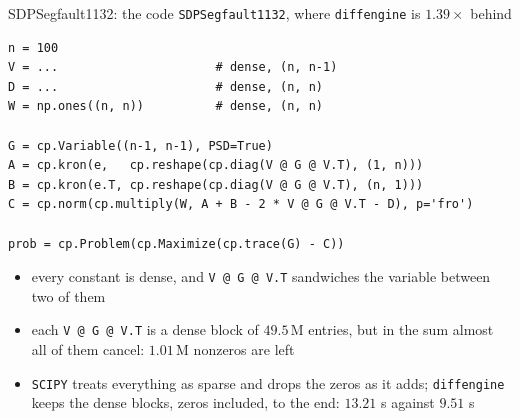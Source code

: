 \documentclass[10pt,mathserif,aspectratio=169]{beamer}
\newcommand{\bul}{\setlength\itemsep{1.1ex}}
\newcommand{\de}{\texttt{diffengine}}
\begin{document}
\begin{frame}[fragile,label=bk-loss]{SDPSegfault1132: the code}
\vspace{-1ex}
{\scriptsize\color{black!55} \texttt{SDPSegfault1132}, where \de{} is
$1.39\times$ behind}

\begin{center}
\begin{minipage}{0.82\textwidth}
\begin{lstlisting}[language=mypython, basicstyle=\ttfamily\small,
                   aboveskip=0.2em, belowskip=0.2em]
n = 100
V = ...                      # dense, (n, n-1)
D = ...                      # dense, (n, n)
W = np.ones((n, n))          # dense, (n, n)

G = cp.Variable((n-1, n-1), PSD=True)
A = cp.kron(e,   cp.reshape(cp.diag(V @ G @ V.T), (1, n)))
B = cp.kron(e.T, cp.reshape(cp.diag(V @ G @ V.T), (n, 1)))
C = cp.norm(cp.multiply(W, A + B - 2 * V @ G @ V.T - D), p='fro')

prob = cp.Problem(cp.Maximize(cp.trace(G) - C))
\end{lstlisting}
\end{minipage}
\end{center}

\begin{itemize}\small\bul
  \item every constant is dense, and \texttt{V @ G @ V.T} sandwiches the variable between
        two of them
  \item each \texttt{V @ G @ V.T} is a dense block of $49.5$\,M entries, but in the sum
        {\color{polyblue}almost all of them cancel}: $1.01$\,M nonzeros are left
  \item \texttt{SCIPY} treats everything as sparse and drops the zeros as it adds; \de{} keeps
        the dense blocks, zeros included, to the end: $13.21$ s against $9.51$ s
\end{itemize}
\end{frame}
\end{document}
